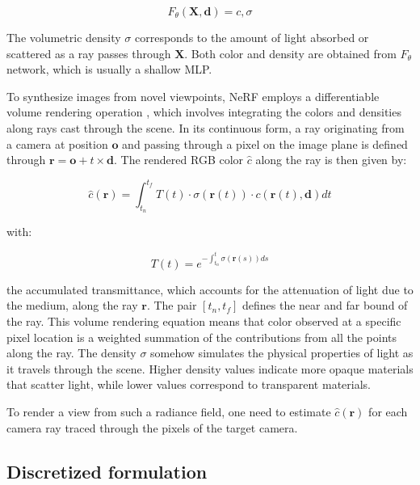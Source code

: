 \begin{equation}
  F_{\theta}(\mathbf{X},\mathbf{d}) = c,\sigma
\end{equation}

The volumetric density $\sigma$ corresponds to the amount of light absorbed or scattered as a ray passes through $\mathbf{X}$. Both color and density are obtained from $F_{\theta}$ network, which is usually a shallow \ac{MLP}.

To synthesize images from novel viewpoints, \ac{NeRF} employs a differentiable volume rendering operation \citep{max1995optical}, which involves integrating the colors and densities along rays cast through the scene. In its continuous form, a ray originating from a camera at position \(\mathbf{o}\) and passing through a pixel on the image plane is defined through $\mathbf{r} = \textbf{o} + t\times \mathbf{d}$. The rendered RGB color $\hat{c}$ along the ray is then given by: 

\begin{equation}
  \label{eq:vr-nerf}
  \hat{c}(\mathbf{r}) = \int_{t_n}^{t_f} T(t) \cdot \sigma(\mathbf{r}(t)) \cdot c(\mathbf{r}(t),\mathbf{d}) dt
\end{equation}

\noindent with: 

\begin{equation}
  T(t) = e^{-\int_{t_n}^{t}\sigma(\mathbf{r}(s))ds}
\end{equation}

\noindent the accumulated transmittance, which accounts for the attenuation of light due to the medium, along the ray $\mathbf{r}$.  The pair $[t_{n},t_{f}]$ defines the near and far bound of the ray. This volume rendering equation means that color observed at a specific pixel location is a weighted summation of the contributions from all the points along the ray. The density $\sigma$ somehow simulates the physical properties of light as it travels through the scene. Higher density values indicate more opaque materials that scatter light, while lower values correspond to transparent materials.  

To render a view from such a radiance field, one need to estimate $\hat{c}(\mathbf{r})$ for each camera ray traced through the pixels of the target camera. 

\subsection{Discretized formulation}

